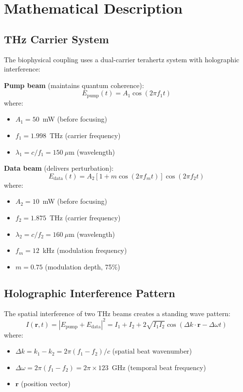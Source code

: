 \section{Mathematical Description}

\subsection{THz Carrier System}

The biophysical coupling uses a dual-carrier terahertz system with holographic interference:

\textbf{Pump beam} (maintains quantum coherence):
\begin{equation}
E_{\text{pump}}(t) = A_1 \cos(2\pi f_1 t)
\label{eq:pump-beam}
\end{equation}
where:
\begin{itemize}
\item $A_1 = 50$~mW (before focusing)
\item $f_1 = 1.998$~THz (carrier frequency)
\item $\lambda_1 = c/f_1 = 150~\mu$m (wavelength)
\end{itemize}

\textbf{Data beam} (delivers perturbation):
\begin{equation}
E_{\text{data}}(t) = A_2 [1 + m \cos(2\pi f_m t)] \cos(2\pi f_2 t)
\label{eq:data-beam}
\end{equation}
where:
\begin{itemize}
\item $A_2 = 10$~mW (before focusing)
\item $f_2 = 1.875$~THz (carrier frequency)
\item $\lambda_2 = c/f_2 = 160~\mu$m (wavelength)
\item $f_m = 12$~kHz (modulation frequency)
\item $m = 0.75$ (modulation depth, 75\%)
\end{itemize}

\subsection{Holographic Interference Pattern}

The spatial interference of two THz beams creates a standing wave pattern:
\begin{equation}
I(\mathbf{r}, t) = |E_{\text{pump}} + E_{\text{data}}|^2 = I_1 + I_2 + 2\sqrt{I_1 I_2}\cos(\Delta k \cdot \mathbf{r} - \Delta\omega t)
\label{eq:interference}
\end{equation}
where:
\begin{itemize}
\item $\Delta k = k_1 - k_2 = 2\pi(f_1 - f_2)/c$ (spatial beat wavenumber)
\item $\Delta\omega = 2\pi(f_1 - f_2) = 2\pi \times 123$~GHz (temporal beat frequency)
\item $\mathbf{r}$ (position vector)
\end{itemize}

